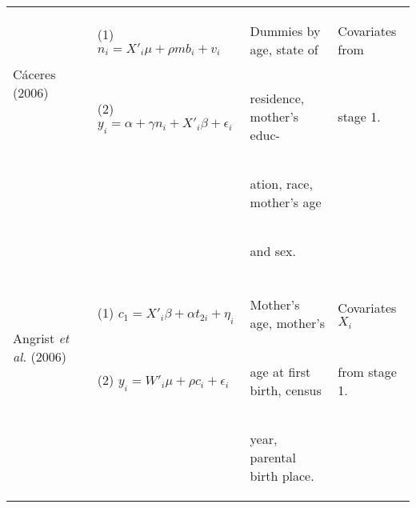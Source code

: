 \documentclass{article}[11pt,subeqn]
\begin{document}
\begin{spacing}{1.25}
\begin{center}
\begin{rotate}{90}
\begin{tabular}{lp{4mm}lll}
\multirow{2}{*}{C\'aceres (2006)} & &
(1) $n_i=X'_i\mu + \rho mb_i + v_i$ &
\begin{small}Dummies by age, state of\end{small}&
\begin{small}Covariates from\end{small}
\\
& &
(2) $y_i=\alpha + \gamma n_i + X'_i\beta + \epsilon_i$ &
\begin{small}residence, mother's educ- \end{small}&
\begin{small}stage 1.\end{small}
\\
& & &
\begin{small}ation, race, mother's age\end{small}&
\\
& & &
\begin{small}and sex.\end{small}&
\\
\begin{footnotesize}\end{footnotesize}&\begin{footnotesize}\end{footnotesize}&\begin{footnotesize}\end{footnotesize}&\begin{footnotesize}\end{footnotesize}&\begin{footnotesize}\end{footnotesize}\\
\multirow{2}{*}{Angrist \emph{et al.} (2006)} &  &
(1)  $c_1=X'_i\beta+\alpha t_{2i}+\eta_i$ &
\begin{small}Mother's age, mother's \end{small} & 
\begin{small}Covariates $X_i$\end{small}
\\
& &
(2) $y_i=W'_i\mu+\rho c_i + \epsilon_i$ &  
\begin{small}age at first birth, census \end{small} &
\begin{small}from stage 1.\end{small}
\\
& & &
\begin{small}year, parental birth place.\end{small}&
\\

\end{tabular}
\end{rotate}
\end{center}
\end{spacing}
\end{document}
